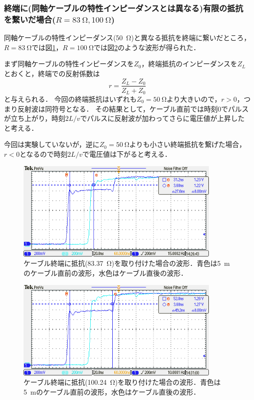 \documentclass[a4paper,11pt]{jsarticle}
\begin{document}
\subsubsection{終端に(同軸ケーブルの特性インピーダンスとは異なる)有限の抵抗を繋いだ場合($R=\SI{83}{\ohm}, \SI{100}{\ohm}$)}
同軸ケーブルの特性インピーダンス(\SI{50}{\ohm})と異なる抵抗を終端に繋いだところ，$R=\SI{83}{\ohm}$では図\ref{fig:R=83}，$R=\SI{100}{\ohm}$では図\ref{fig:R=100}のような波形が得られた．

まず同軸ケーブルの特性インピーダンスを$Z_0$，終端抵抗のインピーダンスを$Z_L$とおくと，終端での反射係数は
\begin{equation}
  r = \frac{Z_L - Z_0}{Z_L + Z_0}
\end{equation}
と与えられる．
今回の終端抵抗はいずれも$Z_0=\SI{50}{\ohm}$より大きいので，$r>0$，つまり反射波は同符号となる．
その結果として，ケーブル直前では時刻0でパルスが立ち上がり，時刻$2L/v$でパルスに反射波が加わってさらに電圧値が上昇したと考える．

今回は実験していないが，逆に$Z_0=\SI{50}{\ohm}$よりも小さい終端抵抗を繋げた場合，$r<0$となるので時刻$2L/v$で電圧値は下がると考える．

\begin{figure}[htbp]
  \centering
  \includegraphics[width=10cm]{TEK00730.png}
  \caption{ケーブル終端に抵抗(\SI{83.37}{\ohm})を取り付けた場合の波形．青色は\SI{5}{m}のケーブル直前の波形，水色はケーブル直後の波形．}
  \label{fig:R=83}
\end{figure}

\begin{figure}[htbp]
  \centering
  \includegraphics[width=10cm]{TEK00731.png}
  \caption{ケーブル終端に抵抗(\SI{100.24}{\ohm})を取り付けた場合の波形．青色は\SI{5}{m}のケーブル直前の波形，水色はケーブル直後の波形．}
  \label{fig:R=100}
\end{figure}
\end{document}
